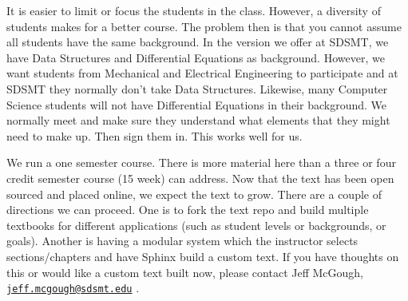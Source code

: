 It is easier to limit or focus the students in the class. However, a
diversity of students makes for a better course. The problem then is
that you cannot assume all students have the same background. In the
version we offer at SDSMT, we have Data Structures and Differential
Equations as background. However, we want students from Mechanical and
Electrical Engineering to participate and at SDSMT they normally don't
take Data Structures. Likewise, many Computer Science students will not
have Differential Equations in their background. We normally meet and
make sure they understand what elements that they might need to make up.
Then sign them in. This works well for us.

We run a one semester course. There is more material here than a three
or four credit semester course (15 week) can address. Now that the text
has been open sourced and placed online, we expect the text to grow.
There are a couple of directions we can proceed. One is to fork the text
repo and build multiple textbooks for different applications (such as
student levels or backgrounds, or goals). Another is having a modular
system which the instructor selects sections/chapters and have Sphinx
build a custom text. If you have thoughts on this or would like a custom
text built now, please contact Jeff McGough,
\href{mailto:jeff.mcgough@sdsmt.edu}{\nolinkurl{jeff.mcgough@sdsmt.edu}}
.

